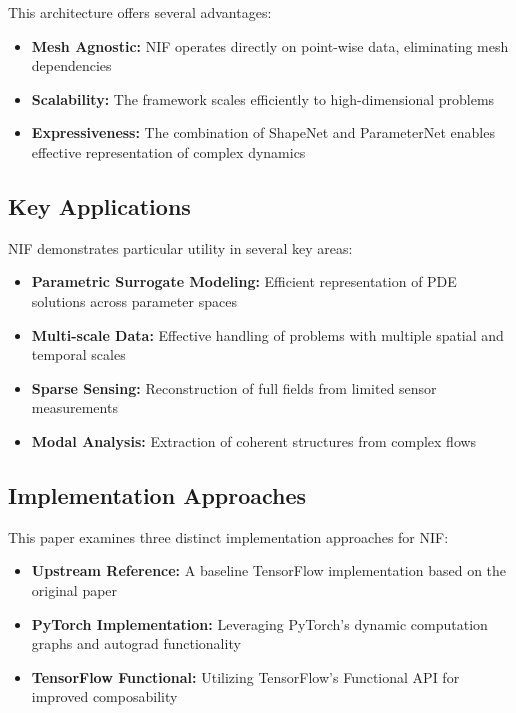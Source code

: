 \documentclass[10pt,journal,compsoc,onecolumn]{IEEEtran}
\begin{document}
This architecture offers several advantages:

\begin{itemize}
    \item \textbf{Mesh Agnostic:} NIF operates directly on point-wise data, eliminating mesh dependencies
    \item \textbf{Scalability:} The framework scales efficiently to high-dimensional problems
    \item \textbf{Expressiveness:} The combination of ShapeNet and ParameterNet enables effective representation of complex dynamics
\end{itemize}

\subsection{Key Applications}
NIF demonstrates particular utility in several key areas:

\begin{itemize}
    \item \textbf{Parametric Surrogate Modeling:} Efficient representation of PDE solutions across parameter spaces
    \item \textbf{Multi-scale Data:} Effective handling of problems with multiple spatial and temporal scales
    \item \textbf{Sparse Sensing:} Reconstruction of full fields from limited sensor measurements
    \item \textbf{Modal Analysis:} Extraction of coherent structures from complex flows
\end{itemize}

\subsection{Implementation Approaches}
This paper examines three distinct implementation approaches for NIF:

\begin{itemize}
    \item \textbf{Upstream Reference:} A baseline TensorFlow implementation based on the original paper
    \item \textbf{PyTorch Implementation:} Leveraging PyTorch's dynamic computation graphs and autograd functionality
    \item \textbf{TensorFlow Functional:} Utilizing TensorFlow's Functional API for improved composability
\end{itemize}
\end{document}
